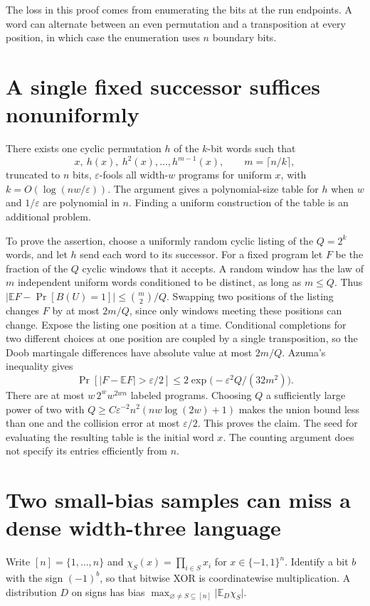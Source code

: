 \documentclass[11pt]{article}
\newcommand{\E}{\mathbb E}
\newcommand{\Cube}{\{-1,1\}}
\newcommand{\card}[1]{\lvert #1\rvert}
\begin{document}
The loss in this proof comes from enumerating the bits at the run
endpoints. A word can alternate between an even permutation and a
transposition at every position, in which case the enumeration uses
$n$ boundary bits.

\section{A single fixed successor suffices nonuniformly}
There exists one cyclic permutation $h$ of the $k$-bit words such that
\[
  x,\ h(x),\ h^2(x),\ldots,h^{m-1}(x),
  \qquad m=\lceil n/k\rceil,
\]
truncated to $n$ bits, $\varepsilon$-fools all width-$w$ programs for uniform $x$, with $k=O(\log(nw/\varepsilon))$. The argument gives a polynomial-size table for $h$ when $w$ and $1/\varepsilon$ are polynomial in $n$. Finding a uniform construction of the table is an additional problem.

To prove the assertion, choose a uniformly random cyclic listing of the $Q=2^k$ words, and let $h$ send each word to its successor. For a fixed program let $F$ be the fraction of the $Q$ cyclic windows that it accepts. A random window has the law of $m$ independent uniform words conditioned to be distinct, as long as $m\le Q$. Thus $|\mathbb EF-\Pr[B(U)=1]|\le \binom m2/Q$. Swapping two positions of the listing changes $F$ by at most $2m/Q$, since only windows meeting these positions can change. Expose the listing one position at a time. Conditional completions for two different choices at one position are coupled by a single transposition, so the Doob martingale differences have absolute value at most $2m/Q$. Azuma's inequality gives
\[
  \Pr[|F-\mathbb EF|>\varepsilon/2]
       \le 2\exp\bigl(-\varepsilon^2 Q/(32m^2)\bigr).
\]
There are at most $w\,2^w w^{2wn}$ labeled programs. Choosing $Q$ a sufficiently large power of two with $Q\ge C\varepsilon^{-2}n^2(nw\log(2w)+1)$ makes the union bound less than one and the collision error at most $\varepsilon/2$. This proves the claim. The seed for evaluating the resulting table is the initial word $x$. The counting argument does not specify its entries efficiently from $n$.

\clearpage
\section{Two small-bias samples can miss a dense width-three language}

Write $[n]=\{1,\ldots,n\}$ and $\chi_S(x)=\prod_{i\in S}x_i$ for
$x\in\Cube^n$. Identify a bit $b$ with the sign $(-1)^b$, so that bitwise
XOR is coordinatewise multiplication. A distribution $D$ on signs
has bias $\max_{\varnothing\ne S\subseteq[n]}\card{\E_D\chi_S}$.
\end{document}
